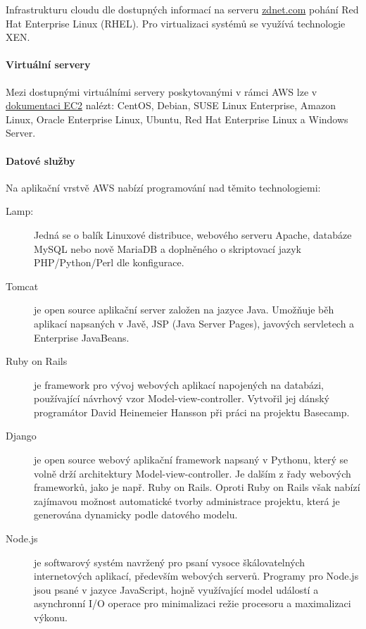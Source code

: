 Infrastrukturu cloudu dle dostupných informací na serveru \href{http://www.zdnet.com/blog/open-source/amazon-ec2-cloud-is-made-up-of-almost-half-a-million-linux-servers/10620}{zdnet.com\cite{zdnet:amazonLinux}} pohání Red Hat Enterprise Linux (RHEL). Pro virtualizaci systémů se využívá technologie XEN.

\paragraph{Virtuální servery}
Mezi dostupnými virtuálními servery poskytovanými v rámci AWS lze v \href{http://aws.amazon.com/ec2/details/}{dokumentaci EC2\cite{amazon:ec2Details}} nalézt: CentOS, Debian, SUSE Linux Enterprise, Amazon Linux, Oracle Enterprise Linux, Ubuntu, Red Hat Enterprise Linux a Windows Server.

\paragraph{Datové služby}
Na aplikační vrstvě AWS nabízí programování nad těmito technologiemi:
\begin{description}
	\item [Lamp:] Jedná se o balík Linuxové distribuce, webového serveru Apache, databáze MySQL nebo nově MariaDB a doplněného o skriptovací jazyk PHP/Python/Perl dle konfigurace.
	\item [Tomcat] je open source aplikační server založen na jazyce Java. Umožňuje běh aplikací napsaných v Javě, JSP (Java Server Pages), javových servletech a Enterprise JavaBeans.
	\item [Ruby on Rails] je framework pro vývoj webových aplikací napojených na databázi, používající návrhový vzor Model-view-controller. Vytvořil jej dánský programátor David Heinemeier Hansson při práci na projektu Basecamp.\cite{wiki:rails}
	\item [Django] je open source webový aplikační framework napsaný v Pythonu, který se volně drží architektury Model-view-controller. Je dalším z řady webových frameworků, jako je např. Ruby on Rails. Oproti Ruby on Rails však nabízí zajímavou možnost automatické tvorby administrace projektu, která je generována dynamicky podle datového modelu.\cite{wiki:django}
	\item [Node.js] je softwarový systém navržený pro psaní vysoce škálovatelných internetových aplikací, především webových serverů. Programy pro Node.js jsou psané v jazyce JavaScript, hojně využívající model událostí a asynchronní I/O operace pro minimalizaci režie procesoru a maximalizaci výkonu.\cite{wiki:node.js}
\end{description}

